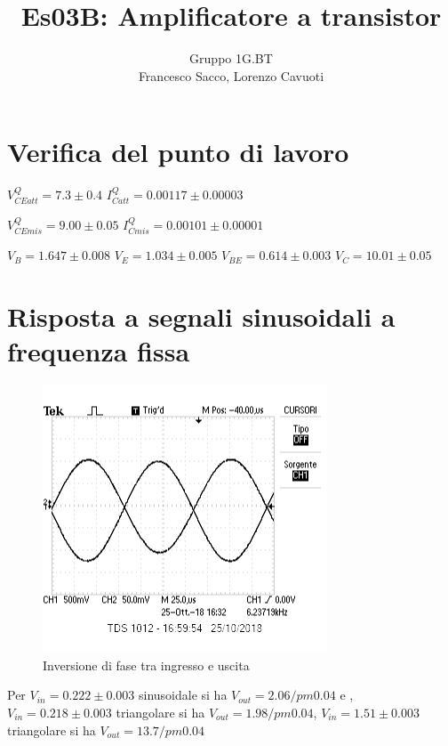 \documentclass[10pt,a4paper]{article}
\author{Gruppo 1G.BT \\ Francesco Sacco, Lorenzo Cavuoti}
\title{Es03B: Amplificatore a transistor}
\begin{document}
	\maketitle
	\section{Verifica del punto di lavoro}
	
	$V_{CEatt}^Q = 7.3\pm0.4$
	$I_{Catt}^Q = 0.00117\pm0.00003$

	$V_{CEmis}^Q = 9.00\pm0.05$
	$I_{Cmis}^Q = 0.00101\pm0.00001$
	
	$V_{B} = 1.647\pm0.008$
	$V_{E} = 1.034\pm 0.005$
	$V_{BE} = 0.614\pm0.003$
	$V_{C} = 10.01\pm0.05$
	
	\section{Risposta a segnali sinusoidali a frequenza fissa}
	\begin{figure}
	\centering
	\includegraphics[scale=0.7]{3_1.png}
	\caption{Inversione di fase tra ingresso e uscita} 
	\end{figure}
	Per $V_{in} = 0.222\pm0.003$ sinusoidale si ha $V_{out} = 2.06/pm0.04$ e ,$V_{in} = 0.218\pm0.003$ triangolare si ha $V_{out} = 1.98/pm0.04$, $V_{in} = 1.51\pm0.003$ triangolare si ha $V_{out} = 13.7/pm0.04$ 
		
\end{document}
